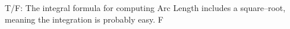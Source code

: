 {T/F: The integral formula for computing Arc Length includes a square--root, meaning the integration is probably easy.}
{F}
